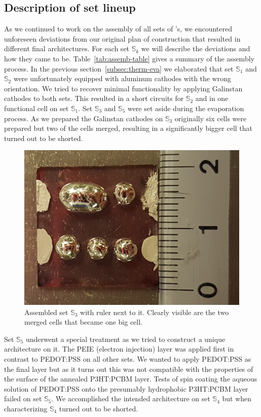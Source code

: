 \documentclass[a4paper,10pt,twocolumn]{article}
\begin{document}
\begin{extract*}
\subsection{Description of set lineup}
As we continued to work on the assembly of all sets of \BHSC's, we encountered unforeseen deviations from our original plan of construction that resulted in different final architectures. For each set $\mathbb{S}_k$ we will describe the deviations and how they came to be. Table~\ref{tab:assemb-table} gives a summary of the assembly process.\mypar
In the previous section~\ref{subsec:therm-eva} we elaborated that set $\mathbb{S}_1$ and $\mathbb{S}_2$ were unfortunately equipped with aluminum cathodes with the wrong orientation. We tried to recover minimal functionality by applying Galinstan cathodes to both sets. This resulted in a short circuits for $\mathbb{S}_2$ and in one functional cell on set $\mathbb{S}_1$.\mypar
Set $\mathbb{S}_3$ and $\mathbb{S}_5$ were set aside during the evaporation process. As we prepared the Galinstan cathodes on $\mathbb{S}_3$ originally six cells were prepared but two of the cells merged, resulting in a significantly bigger cell that turned out to be shorted.

\begin{figure}[h]\centering
	\includegraphics[width=0.9\columnwidth]{../1_Pictures/cell3.png}
	\caption{Assembled set $\mathbb{S}_3$ with ruler next to it. Clearly visible are the two merged cells that became one big cell.}
\end{figure}
Set $\mathbb{S}_5$ underwent a special treatment as we tried to construct a unique architecture on it. The PEIE (electron injection) layer was applied first in contrast to PEDOT:PSS on all other sets. We wanted to apply PEDOT:PSS as the final layer but as it turns out this was not compatible with the properties of the surface of the annealed P3HT:PCBM layer. Tests of spin coating the aqueous solution of PEDOT:PSS onto the presumably hydrophobic P3HT:PCBM layer failed on set $\mathbb{S}_5$.\mypar
We accomplished the intended architecture on set $\mathbb{S}_4$ but when characterizing $\mathbb{S}_4$ turned out to be shorted.

\end{extract*}
\end{document}
